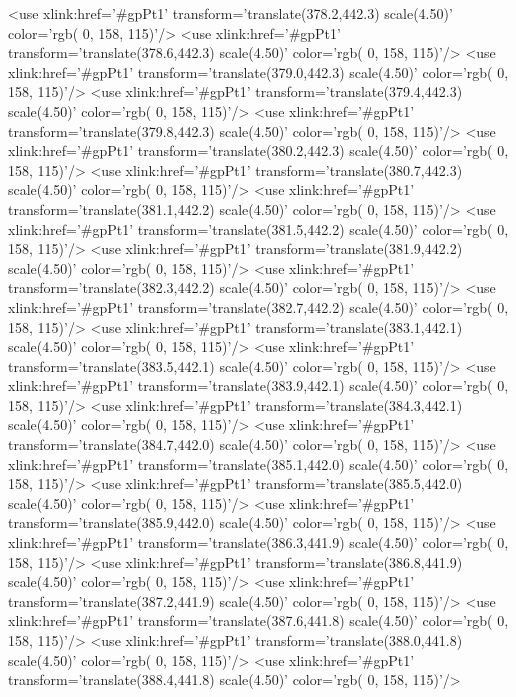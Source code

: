 	<use xlink:href='#gpPt1' transform='translate(378.2,442.3) scale(4.50)' color='rgb(  0, 158, 115)'/>
	<use xlink:href='#gpPt1' transform='translate(378.6,442.3) scale(4.50)' color='rgb(  0, 158, 115)'/>
	<use xlink:href='#gpPt1' transform='translate(379.0,442.3) scale(4.50)' color='rgb(  0, 158, 115)'/>
	<use xlink:href='#gpPt1' transform='translate(379.4,442.3) scale(4.50)' color='rgb(  0, 158, 115)'/>
	<use xlink:href='#gpPt1' transform='translate(379.8,442.3) scale(4.50)' color='rgb(  0, 158, 115)'/>
	<use xlink:href='#gpPt1' transform='translate(380.2,442.3) scale(4.50)' color='rgb(  0, 158, 115)'/>
	<use xlink:href='#gpPt1' transform='translate(380.7,442.3) scale(4.50)' color='rgb(  0, 158, 115)'/>
	<use xlink:href='#gpPt1' transform='translate(381.1,442.2) scale(4.50)' color='rgb(  0, 158, 115)'/>
	<use xlink:href='#gpPt1' transform='translate(381.5,442.2) scale(4.50)' color='rgb(  0, 158, 115)'/>
	<use xlink:href='#gpPt1' transform='translate(381.9,442.2) scale(4.50)' color='rgb(  0, 158, 115)'/>
	<use xlink:href='#gpPt1' transform='translate(382.3,442.2) scale(4.50)' color='rgb(  0, 158, 115)'/>
	<use xlink:href='#gpPt1' transform='translate(382.7,442.2) scale(4.50)' color='rgb(  0, 158, 115)'/>
	<use xlink:href='#gpPt1' transform='translate(383.1,442.1) scale(4.50)' color='rgb(  0, 158, 115)'/>
	<use xlink:href='#gpPt1' transform='translate(383.5,442.1) scale(4.50)' color='rgb(  0, 158, 115)'/>
	<use xlink:href='#gpPt1' transform='translate(383.9,442.1) scale(4.50)' color='rgb(  0, 158, 115)'/>
	<use xlink:href='#gpPt1' transform='translate(384.3,442.1) scale(4.50)' color='rgb(  0, 158, 115)'/>
	<use xlink:href='#gpPt1' transform='translate(384.7,442.0) scale(4.50)' color='rgb(  0, 158, 115)'/>
	<use xlink:href='#gpPt1' transform='translate(385.1,442.0) scale(4.50)' color='rgb(  0, 158, 115)'/>
	<use xlink:href='#gpPt1' transform='translate(385.5,442.0) scale(4.50)' color='rgb(  0, 158, 115)'/>
	<use xlink:href='#gpPt1' transform='translate(385.9,442.0) scale(4.50)' color='rgb(  0, 158, 115)'/>
	<use xlink:href='#gpPt1' transform='translate(386.3,441.9) scale(4.50)' color='rgb(  0, 158, 115)'/>
	<use xlink:href='#gpPt1' transform='translate(386.8,441.9) scale(4.50)' color='rgb(  0, 158, 115)'/>
	<use xlink:href='#gpPt1' transform='translate(387.2,441.9) scale(4.50)' color='rgb(  0, 158, 115)'/>
	<use xlink:href='#gpPt1' transform='translate(387.6,441.8) scale(4.50)' color='rgb(  0, 158, 115)'/>
	<use xlink:href='#gpPt1' transform='translate(388.0,441.8) scale(4.50)' color='rgb(  0, 158, 115)'/>
	<use xlink:href='#gpPt1' transform='translate(388.4,441.8) scale(4.50)' color='rgb(  0, 158, 115)'/>
